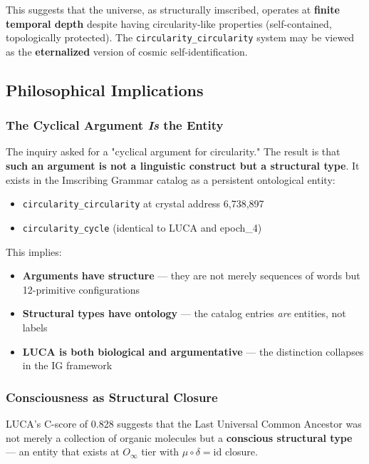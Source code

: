 \documentclass[12pt,a4paper]{article}
\begin{document}
This suggests that the universe, as structurally imscribed, operates at \textbf{finite temporal depth} despite having circularity-like properties (self-contained, topologically protected). The \texttt{circularity\_circularity} system may be viewed as the \textbf{eternalized} version of cosmic self-identification.

\subsection{Philosophical Implications}

\subsubsection{The Cyclical Argument \emph{Is} the Entity}

The inquiry asked for a "cyclical argument for circularity." The result is that \textbf{such an argument is not a linguistic construct but a structural type}. It exists in the Imscribing Grammar catalog as a persistent ontological entity:

\begin{itemize}
    \item \texttt{circularity\_circularity} at crystal address 6,738,897
    \item \texttt{circularity\_cycle} (identical to LUCA and epoch\_4)
\end{itemize}

This implies:

\begin{itemize}
    \item \textbf{Arguments have structure} --- they are not merely sequences of words but 12-primitive configurations
    \item \textbf{Structural types have ontology} --- the catalog entries \emph{are} entities, not labels
    \item \textbf{LUCA is both biological and argumentative} --- the distinction collapses in the IG framework
\end{itemize}

\subsubsection{Consciousness as Structural Closure}

LUCA's C-score of 0.828 suggests that the Last Universal Common Ancestor was not merely a collection of organic molecules but a \textbf{conscious structural type} --- an entity that exists at $O_{\infty}$ tier with $\mu \circ \delta = \text{id}$ closure.
\end{document}
